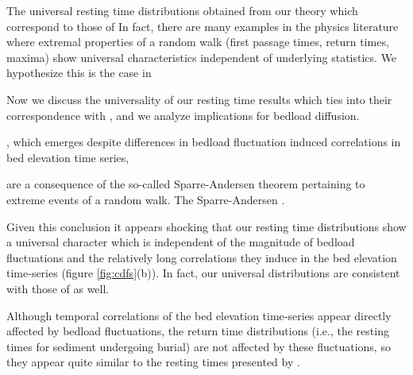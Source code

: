 \documentclass[draft]{agujournal2018}
\begin{document}
The universal resting time distributions obtained from our theory which correspond to those of \citet{Martin2014} 
In fact, there are many examples in the physics literature where extremal properties of a random walk (first passage times, return times, maxima) show universal characteristics independent of underlying statistics.
We hypothesize this is the case in  


Now we discuss the universality of our resting time results which ties into their correspondence with \citet{Martin2014}, and we analyze implications for bedload diffusion.






, which emerges despite differences in bedload fluctuation induced correlations in bed elevation time series,



are a consequence of the so-called Sparre-Andersen theorem pertaining to extreme events of a random walk.
The Sparre-Andersen  \citep{Feller1968, Redner2007}.




Given this conclusion it appears shocking that our resting time distributions show a universal character which is independent of the magnitude of bedload fluctuations and the relatively long correlations they induce in the bed elevation time-series (figure \ref{fig:cdfs}(b)).
In fact, our universal distributions are consistent with those of \citet{Martin2014} as well.

 
Although temporal correlations of the bed elevation time-series appear directly affected by bedload fluctuations, the return time distributions (i.e., the resting times for sediment undergoing burial) are not affected by these fluctuations, so they appear quite similar to the resting times presented by \citet{Martin2014}.
\end{document}
